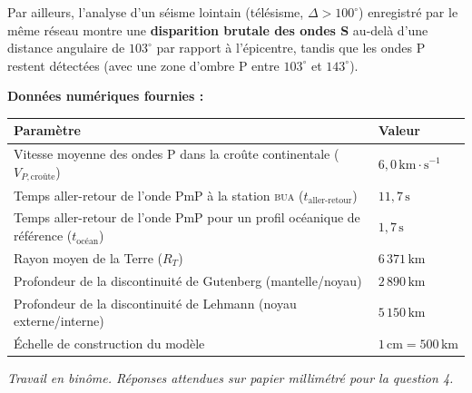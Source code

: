 \documentclass[11pt]{article}
\newcounter{popsec}
\newcounter{popsub}
\newcommand{\courssub}[1]{%
  \stepcounter{popsub}%
  \par\vspace{9pt}\noindent{\popxbold\fontsize{11.5}{13}\selectfont\color{popink}{\color{poporange}\thepopsec.\thepopsub}\hspace{6pt}#1}\par\nopagebreak\vspace{4pt}
}
\begin{document}
Par ailleurs, l'analyse d'un séisme lointain (télésisme, $\Delta > 100^\circ$) enregistré par le même réseau montre une \textbf{disparition brutale des ondes S} au-delà d'une distance angulaire de $103^\circ$ par rapport à l'épicentre, tandis que les ondes P restent détectées (avec une zone d'ombre P entre $103^\circ$ et $143^\circ$).

\textbf{Données numériques fournies :}
\begin{center}
\begin{tabularx}{\linewidth}{|l|X|}\hline
\textbf{Paramètre} & \textbf{Valeur} \\ \hline
Vitesse moyenne des ondes P dans la croûte continentale ($V_{P,\text{croûte}}$) & $6,0\,\text{km}\cdot\text{s}^{-1}$ \\ \hline
Temps aller-retour de l'onde PmP à la station \textsc{bua} ($t_{\text{aller-retour}}$) & $11,7\,\text{s}$ \\ \hline
Temps aller-retour de l'onde PmP pour un profil océanique de référence ($t_{\text{océan}}$) & $1,7\,\text{s}$ \\ \hline
Rayon moyen de la Terre ($R_T$) & $6\,371\,\text{km}$ \\ \hline
Profondeur de la discontinuité de Gutenberg (mantelle/noyau) & $2\,890\,\text{km}$ \\ \hline
Profondeur de la discontinuité de Lehmann (noyau externe/interne) & $5\,150\,\text{km}$ \\ \hline
Échelle de construction du modèle & $1\,\text{cm} = 500\,\text{km}$ \\ \hline
\end{tabularx}
\end{center}

\courssub{Consignes}
\emph{Travail en binôme. Réponses attendues sur papier millimétré pour la question 4.}
\end{document}
